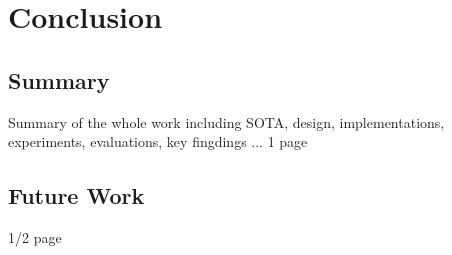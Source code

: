 \chapter{Conclusion}
\label{chapter:conclusion}


\section{Summary}
\label{sec:conclusion-summary}

Summary of the whole work including SOTA, design, implementations, experiments, evaluations, key fingdings ... 1 page

\section{Future Work}
\label{sec:conclusion-future-work}

1/2 page